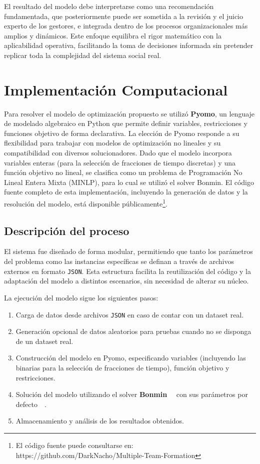 \documentclass[conference]{IEEEtran}
\begin{document}
El resultado del modelo debe interpretarse como una recomendación fundamentada, que posteriormente puede ser sometida a la revisión y el juicio experto de los gestores, e integrada dentro de los procesos organizacionales más amplios y dinámicos. Este enfoque equilibra el rigor matemático con la aplicabilidad operativa, facilitando la toma de decisiones informada sin pretender replicar toda la complejidad del sistema social real.


\section{Implementación Computacional}

Para resolver el modelo de optimización propuesto se utilizó \textbf{Pyomo}, un lenguaje de modelado algebraico en Python que permite definir variables, restricciones y funciones objetivo de forma declarativa. La elección de Pyomo responde a su flexibilidad para trabajar con modelos de optimización no lineales y su compatibilidad con diversos solucionadores. Dado que el modelo incorpora variables enteras (para la selección de fracciones de tiempo discretas) y una función objetivo no lineal, se clasifica como un problema de Programación No Lineal Entera Mixta (MINLP), para lo cual se utilizó el solver Bonmin. El código fuente completo de esta implementación, incluyendo la generación de datos y la resolución del modelo, está disponible públicamente\footnote{El código fuente puede consultarse en: https://github.com/DarkNacho/Multiple-Team-Formation}.

\subsection{Descripción del proceso}

El sistema fue diseñado de forma modular, permitiendo que tanto los parámetros del problema como las instancias específicas se definan a través de archivos externos en formato \texttt{JSON}. Esta estructura facilita la reutilización del código y la adaptación del modelo a distintos escenarios, sin necesidad de alterar su núcleo.

La ejecución del modelo sigue los siguientes pasos:
\begin{enumerate}
    \item Carga de datos desde archivos \texttt{JSON} en caso de contar con un dataset real.
    \item Generación opcional de datos aleatorios para pruebas cuando no se disponga de un dataset real.
    \item Construcción del modelo en Pyomo, especificando variables (incluyendo las binarias para la selección de fracciones de tiempo), función objetivo y restricciones.
    \item Solución del modelo utilizando el solver \textbf{Bonmin} ~~con sus parámetros por defecto~~.
    \item Almacenamiento y análisis de los resultados obtenidos.
\end{enumerate}
\end{document}
